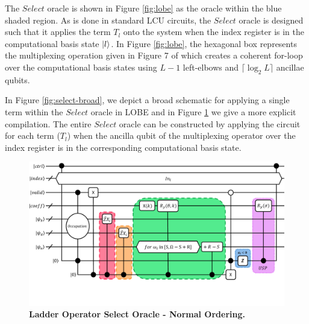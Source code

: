The $Select$ oracle is shown in Figure \ref{fig:lobe} as the oracle within the blue shaded region.
As is done in standard LCU circuits, the $Select$ oracle is designed such that it applies the term $T_l$ onto the system when the index register is in the computational basis state $\ket{l}$.
In Figure \ref{fig:lobe}, the hexagonal box represents the multiplexing operation given in Figure 7 of \cite{babbush2018encoding} which creates a coherent for-loop over the computational basis states using $L - 1$ left-elbows and $\lceil \log_2{L} \rceil$ ancillae qubits.

In Figure \ref{fig:select-broad}, we depict a broad schematic for applying a single term within the $Select$ oracle in LOBE and in Figure \ref{fig:select-normal-ordering} we give a more explicit compilation.
The entire $Select$ oracle can be constructed by applying the circuit for each term ($T_l$) when the ancilla qubit of the multiplexing operator over the index register is in the corresponding computational basis state.

\begin{figure}
    \centering
    \includegraphics[width=16cm]{figures/select-normal-ordering.pdf}
    \caption{\textbf{Ladder Operator Select Oracle - Normal Ordering.}
    }
    \label{fig:select-normal-ordering}
\end{figure}

